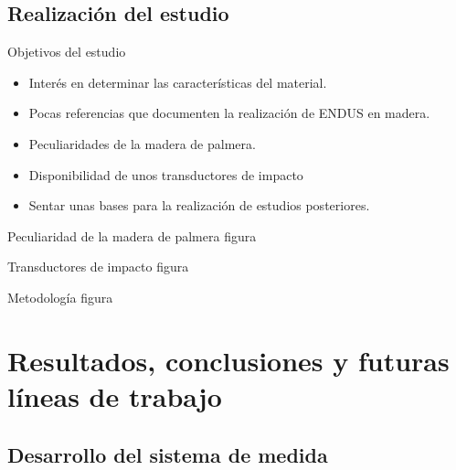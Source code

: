 \documentclass[utf8, compress]			{beamer}
\begin{document}
\subsection{Realización del estudio}

\begin{frame}{Objetivos del estudio}
    \begin{itemize}
	\item Interés en determinar las características del material.
	\item Pocas referencias que documenten la realización de ENDUS en
	    madera.
	\item Peculiaridades de la madera de palmera.
	\item Disponibilidad de unos transductores de impacto
	\item \alert{Sentar unas bases para la realización de estudios
	    posteriores.}
    \end{itemize}
\end{frame}

\begin{frame}{Peculiaridad de la madera de palmera}
    \alert{figura}
\end{frame}

\begin{frame}{Transductores de impacto}
    \alert{figura}
\end{frame}

\begin{frame}{Metodología}
    \alert{figura}
\end{frame}


\section[Resultados y conclusiones]{Resultados, conclusiones y futuras
    líneas de trabajo}

\subsection{Desarrollo del sistema de medida}
\end{document}
